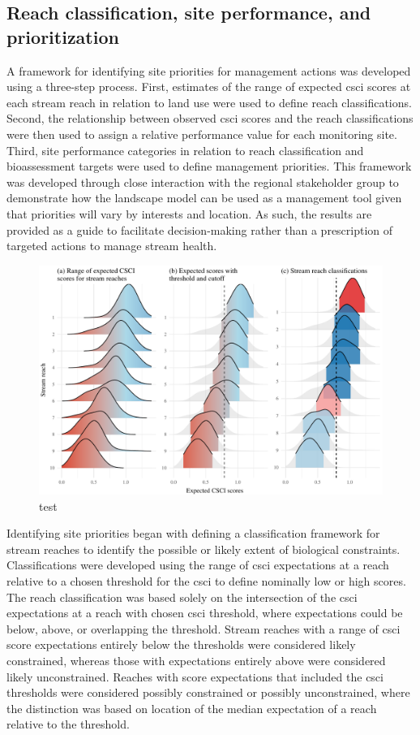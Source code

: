 \documentclass[]{article}
\begin{document}
\subsection{Reach classification, site performance, and
prioritization}\label{reach-classification-site-performance-and-prioritization}

A framework for identifying site priorities for management actions was
developed using a three-step process. First, estimates of the range of
expected \ac{csci} scores at each stream reach in relation to land use
were used to define reach classifications. Second, the relationship
between observed \ac{csci} scores and the reach classifications were
then used to assign a relative performance value for each monitoring
site. Third, site performance categories in relation to reach
classification and bioassessment targets were used to define management
priorities. This framework was developed through close interaction with
the regional stakeholder group to demonstrate how the landscape model
can be used as a management tool given that priorities will vary by
interests and location. As such, the results are provided as a guide to
facilitate decision-making rather than a prescription of targeted
actions to manage stream health.

\begin{figure}
\centering
\includegraphics{figs/ridges-1.pdf}
\caption{test}
\end{figure}

Identifying site priorities began with defining a classification
framework for stream reaches to identify the possible or likely extent
of biological constraints. Classifications were developed using the
range of \ac{csci} expectations at a reach relative to a chosen
threshold for the \ac{csci} to define nominally low or high scores. The
reach classification was based solely on the intersection of the
\ac{csci} expectations at a reach with chosen \ac{csci} threshold, where
expectations could be below, above, or overlapping the threshold. Stream
reaches with a range of \ac{csci} score expectations entirely below the
thresholds were considered likely constrained, whereas those with
expectations entirely above were considered likely unconstrained.
Reaches with score expectations that included the \ac{csci} thresholds
were considered possibly constrained or possibly unconstrained, where
the distinction was based on location of the median expectation of a
reach relative to the threshold.
\end{document}
